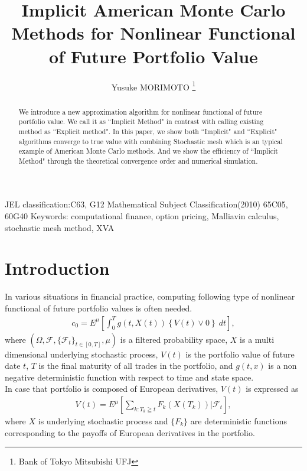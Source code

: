 \documentclass[12pt]{article}
\begin{document}
\title{Implicit American Monte Carlo Methods
for Nonlinear Functional of Future Portfolio Value}

\author{
Yusuke MORIMOTO
\thanks{
Bank of Tokyo Mitsubishi UFJ }
}
\date{}

\maketitle
\begin{abstract}
We introduce a new approximation algorithm for
nonlinear functional of future portfolio value.
We call it as ``Implicit Method" in contrast with calling existing method 
as ``Explicit method".
In this paper, we show both ``Implicit" and ``Explicit" algorithms converge to true value
with combining Stochastic mesh which is an typical example of American Monte Carlo methods.
And we show the efficiency of ``Implicit Method" through
the theoretical convergence order and numerical simulation.
\end{abstract}

JEL classification:C63, G12
Mathematical Subject Classification(2010)   65C05,  60G40
Keywords:  computational finance, option pricing, Malliavin calculus,
stochastic mesh method, XVA

\section{Introduction}

In various situations in financial practice, computing following type of nonlinear functional 
of future portfolio values is often needed.
\begin{align}\label{eq:C0}
    c_0 = E^{\mu}\left[\int_{0}^T g(t, X(t))\left\{V(t) \vee0 \right \} \ dt \right],
\end{align}
where $(\Omega, \mathcal{F}, \{\mathcal{F}_t\}_{t\in [0,T]}, \mu)$ is a filtered probability space, $X$ is a multi dimensional underlying stochastic process, $V(t)$ is the portfolio value of future date $t$, $T$ is the final maturity
of all trades in the portfolio, and $g(t, x)$ is a non negative deterministic function with respect to time and state space.\\
In case that portfolio is composed of European derivatives, $V(t)$ is expressed as
\begin{align}\label{eq:V}
  V(t) =  E^{\mu} \left[ \sum_{k:T_k\geqq t}F_k\left({X}(T_k)\right) |\mathcal{F}_t \right],
\end{align}
where $X$ is underlying stochastic process and $\{F_k\}$ are deterministic functions corresponding to the payoffs of European derivatives in the portfolio.
\end{document}
